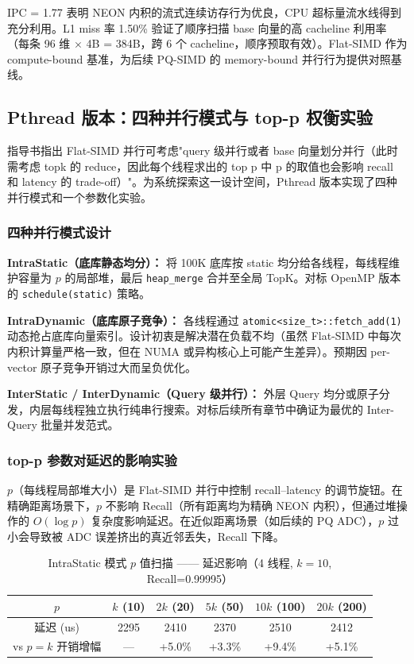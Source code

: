 \documentclass[UTF8,a4paper,10pt]{ctexart}
\begin{document}
IPC = 1.77 表明 NEON 内积的流式连续访存行为优良，CPU 超标量流水线得到充分利用。L1 miss 率 1.50\% 验证了顺序扫描 base 向量的高 cacheline 利用率（每条 96 维 $\times$ 4B = 384B，跨 6 个 cacheline，顺序预取有效）。Flat-SIMD 作为 compute-bound 基准，为后续 PQ-SIMD 的 memory-bound 并行行为提供对照基线。

\subsection{Pthread 版本：四种并行模式与 top-p 权衡实验}

指导书指出 Flat-SIMD 并行可考虑"query 级并行或者 base 向量划分并行（此时需考虑 topk 的 reduce，因此每个线程求出的 top p 中 p 的取值也会影响 recall 和 latency 的 trade-off）"。为系统探索这一设计空间，Pthread 版本实现了四种并行模式和一个参数化实验。

\subsubsection{四种并行模式设计}

\textbf{IntraStatic（底库静态均分）：} 将 100K 底库按 static 均分给各线程，每线程维护容量为 $p$ 的局部堆，最后 \texttt{heap\_merge} 合并至全局 TopK。对标 OpenMP 版本的 \texttt{schedule(static)} 策略。

\textbf{IntraDynamic（底库原子竞争）：} 各线程通过 \texttt{atomic<size\_t>::fetch\_add(1)} 动态抢占底库向量索引。设计初衷是解决潜在负载不均（虽然 Flat-SIMD 中每次内积计算量严格一致，但在 NUMA 或异构核心上可能产生差异）。预期因 per-vector 原子竞争开销过大而呈负优化。

\textbf{InterStatic / InterDynamic（Query 级并行）：} 外层 Query 均分或原子分发，内层每线程独立执行纯串行搜索。对标后续所有章节中确证为最优的 Inter-Query 批量并发范式。

\subsubsection{top-p 参数对延迟的影响实验}

$p$（每线程局部堆大小）是 Flat-SIMD 并行中控制 recall--latency 的调节旋钮。在精确距离场景下，$p$ 不影响 Recall（所有距离均为精确 NEON 内积），但通过堆操作的 $O(\log p)$ 复杂度影响延迟。在近似距离场景（如后续的 PQ ADC），$p$ 过小会导致被 ADC 误差挤出的真近邻丢失，Recall 下降。

\begin{table}[H]
\centering
\caption{IntraStatic 模式 $p$ 值扫描 —— 延迟影响（4 线程, $k=10$, Recall=0.99995）}
\begin{tabular}{cccccc}
\hline
$p$ & $k$ (10) & $2k$ (20) & $5k$ (50) & $10k$ (100) & $20k$ (200) \\
\hline
延迟 (us) & 2295 & 2410 & 2370 & 2510 & 2412 \\
vs $p=k$ 开销增幅 & — & +5.0\% & +3.3\% & +9.4\% & +5.1\% \\
\hline
\end{tabular}
\end{table}
\end{document}
